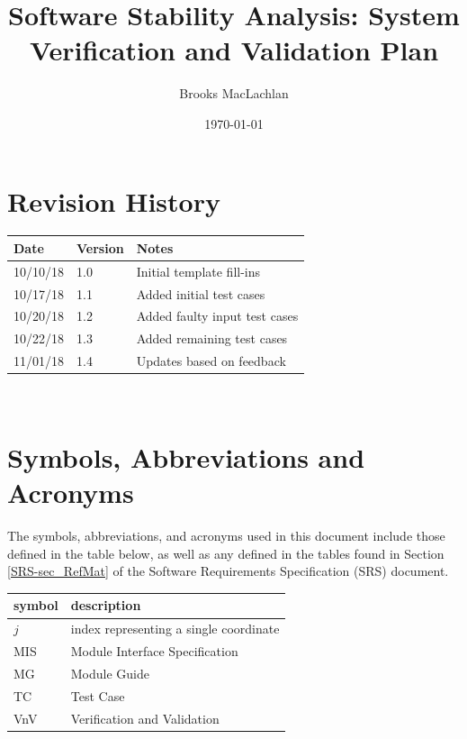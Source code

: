 \documentclass[12pt, titlepage]{article}
\begin{document}
\title{Software Stability Analysis: System Verification and Validation Plan} 
\author{Brooks MacLachlan}
\date{\today}
	
\maketitle


\section{Revision History}

\begin{tabularx}{\textwidth}{p{3cm}p{2cm}X}
\toprule {\bf Date} & {\bf Version} & {\bf Notes}\\
\midrule
10/10/18 & 1.0 & Initial template fill-ins\\
10/17/18 & 1.1 & Added initial test cases\\
10/20/18 & 1.2 & Added faulty input test cases\\
10/22/18 & 1.3 & Added remaining test cases\\
11/01/18 & 1.4 & Updates based on feedback\\
\bottomrule
\end{tabularx}

~\newpage

\section{Symbols, Abbreviations and Acronyms}
The symbols, abbreviations, and acronyms used in this document include those 
defined in the table below, as well as any defined in the tables found in 
Section \ref{SRS-sec_RefMat} of the Software Requirements Specification (SRS) 
document.
\newline

\renewcommand{\arraystretch}{1.2}
\begin{tabular}{l l} 
  \toprule		
  \textbf{symbol} & \textbf{description}\\
  \midrule 
  $j$ & index representing a single coordinate\\
  MIS & Module Interface Specification\\
  MG & Module Guide\\
  TC & Test Case\\
  VnV & Verification and Validation\\
  \bottomrule
\end{tabular}\\
\end{document}
